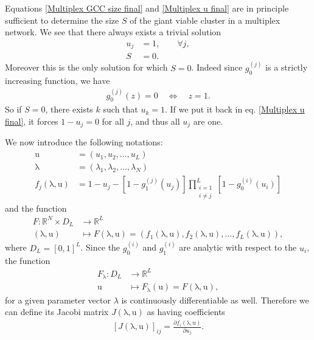 \documentclass[
11pt, %
english, %
singlespacing, %
liststotoc, %
headsepline, %
]{MastersDoctoralThesis} %
\newcommand{\myvec}[1]{\boldsymbol{\mathrm{#1}}} %
\newcommand{\lambdavec}{\myvec{\lambda}}
\newcommand{\uvec}{\myvec{u}}
\begin{document}
Equations \eqref{Multiplex GCC size final} and \eqref{Multiplex u final} are in principle sufficient to determine the size $S$ of the giant viable cluster in a multiplex network. We see that there always exists a trivial solution
\begin{align}
	u_j &= 1, \qquad \forall j,\\
	S &= 0.
\end{align}
Moreover this is the only solution for which $S = 0$. Indeed since $g_0^{(j)}$ is a strictly increasing function, we have
\begin{align}
	g_0^{(j)}(z) = 0 \quad \Leftrightarrow \quad z = 1.
\end{align}
So if $S = 0$, there exists $k$ such that $u_k = 1$. If we put it back in eq. \eqref{Multiplex u final}, it forces $1 - u_j = 0$ for all $j$, and thus all $u_j$ are one.


We now introduce the following notations:
\begin{align}
	\uvec &= (u_1, u_2, \dots, u_L) \\
	\lambdavec &= (\lambda_1, \lambda_2, \dots, \lambda_N) \\
	f_j(\lambdavec, \uvec) &= 1 - u_j - \left[1 - g_1^{(j)}(u_j) \right] \prod_{\substack{i = 1 \\ i \neq j}}^{L}  \left[1 - g_0^{(i)}(u_i) \right] \label{Definition fj}
\end{align}
and the function
\begin{align}
	F : \mathbb{R}^N \times D_L &\rightarrow \mathbb{R}^L \\
	(\lambdavec, \uvec) &\mapsto F(\lambdavec, \uvec) = (f_1(\lambdavec, \uvec), f_2(\lambdavec, \uvec), \dots, f_L(\lambdavec, \uvec)), \label{Definition F}
\end{align}
where $D_L = [0, 1]^L$. Since the $g_0^{(i)}$ and $g_1^{(i)}$ are analytic with respect to the $u_i$, the function
\begin{align}
	F_{\lambdavec} : D_L &\rightarrow \mathbb{R}^L\\
		\uvec &\mapsto F_{\lambdavec}(\uvec) = F(\lambdavec, \uvec),
\end{align}
for a given parameter vector $\lambda$ is continuously differentiable as well. Therefore we can define its Jacobi matrix $J(\lambdavec, \uvec)$ as having coefficients
\begin{align}
	\left[ J(\lambdavec, \uvec) \right]_{ij} = \frac{\partial f_i(\lambdavec,\uvec)}{\partial u_j}.
\end{align}
\end{document}
